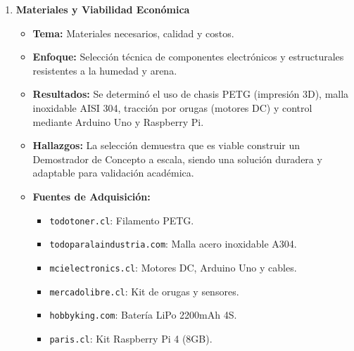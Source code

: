\documentclass[12pt,a4paper]{article}
\begin{document}
\begin{enumerate}[label=\textbf{\Large\arabic*.}, leftmargin=0pt, labelsep=10pt]
	\item \textbf{Materiales y Viabilidad Económica}
	      \begin{itemize}[label=\textbullet]
		      \item \textbf{Tema:} Materiales necesarios, calidad y costos.
		      \item \textbf{Enfoque:} Selección técnica de componentes electrónicos y estructurales resistentes a la humedad y arena.
		      \item \textbf{Resultados:} Se determinó el uso de chasis PETG (impresión 3D), malla inoxidable AISI 304, tracción por orugas (motores DC) y control mediante Arduino Uno y Raspberry Pi.
		      \item \textbf{Hallazgos:} La selección demuestra que es viable construir un Demostrador de Concepto a escala, siendo una solución duradera y adaptable para validación académica.
		      \item \textbf{Fuentes de Adquisición:}
		            \begin{small}
			            \begin{itemize}[label=-]
				            \item \texttt{todotoner.cl}: Filamento PETG.
				            \item \texttt{todoparalaindustria.com}: Malla acero inoxidable A304.
				            \item \texttt{mcielectronics.cl}: Motores DC, Arduino Uno y cables.
				            \item \texttt{mercadolibre.cl}: Kit de orugas y sensores.
				            \item \texttt{hobbyking.com}: Batería LiPo 2200mAh 4S.
				            \item \texttt{paris.cl}: Kit Raspberry Pi 4 (8GB).
			            \end{itemize}
		            \end{small}
	      \end{itemize}

\end{enumerate}
\end{document}
